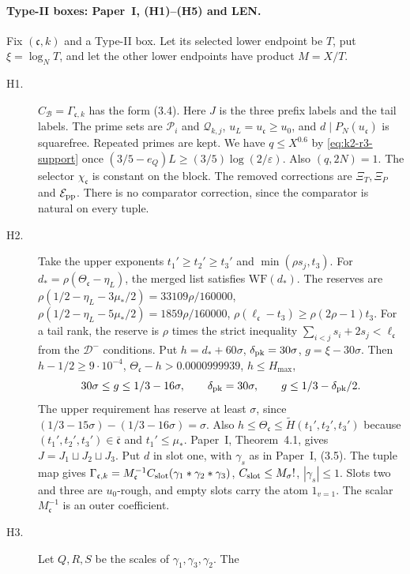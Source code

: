 \paragraph{Type-II boxes: Paper~I, (H1)--(H5) and LEN.}
Fix \((\mathfrak c,k)\) and a Type-II box. Let its selected lower endpoint
be \(T\), put \(\xi=\log_NT\), and let the other lower endpoints have product \(M=X/T\).
\begin{description}
\item[H1.] \(C_{\mathcal B}=\Gamma_{\mathfrak c,k}\) has the form (3.4). Here
\(J\) is the three prefix labels and the tail labels. The prime sets are
\(\mathcal P_i\) and \(\mathcal Q_{k,j}\), \(u_L=u_{\mathfrak c}\ge u_0\),
and \(d\mid P_N(u_{\mathfrak c})\) is squarefree. Repeated primes are kept.
We have \(q\le X^{0.6}\) by \eqref{eq:k2-r3-support} once
\((3/5-e_Q)L\ge(3/5)\log(2/\varepsilon)\). Also \((q,2N)=1\). The
selector \(\chi_{\mathfrak c}\) is constant on the block. The removed
corrections are \(\Xi_T,\Xi_P\) and \(\mathcal E_{\rm pp}\). There is no
comparator correction, since the comparator is natural on every tuple.
\item[H2.] Take the upper exponents \(t_1'\ge t_2'\ge t_3'\) and
\(\min(\rho s_j,t_3)\). For \(d_*=\rho(\Theta_{\mathfrak c}-\eta_L)\), the
merged list satisfies \(\mathrm{WF}(d_*)\). The reserves are
\(\rho(1/2-\eta_L-3\mu_*/2)=33109\rho/160000\),
\(\rho(1/2-\eta_L-5\mu_*/2)=1859\rho/160000\), \(\rho(\ell_{\mathfrak c}-t_3)
\ge\rho(2\rho-1)t_3\). For a tail rank, the reserve is \(\rho\) times the strict
inequality \(\sum_{i<j}s_i+2s_j<\ell_{\mathfrak c}\) from the
\(\mathcal D^-\) conditions. Put \(h=d_*+60\sigma\), \(\delta_{\rm pk}=30\sigma\),
\(g=\xi-30\sigma\). Then \(h-1/2\ge9\cdot10^{-4}\),
\(\Theta_{\mathfrak c}-h>0.0000999939\), \(h\le H_{\max}\),
\[
30\sigma\le g\le1/3-16\sigma,
\qquad \delta_{\rm pk}=30\sigma,
\qquad g\le1/3-\delta_{\rm pk}/2.
\]
The upper requirement has reserve at least \(\sigma\), since
\((1/3-15\sigma)-(1/3-16\sigma)=\sigma\). Also
\(h\le\Theta_{\mathfrak c}\le\widetilde H(t_1',t_2',t_3')\) because
\((t_1',t_2',t_3')\in\overline{\mathfrak c}\) and \(t_1'\le\mu_*\).
Paper~I, Theorem~4.1, gives \(J=J_1\sqcup J_2\sqcup J_3\). Put \(d\) in
slot one, with \(\gamma_s\) as in Paper~I, (3.5). The tuple map gives
\(\Gamma_{\mathfrak c,k}=M_{\mathfrak c}^{-1}C_{\rm slot}(\gamma_1*\gamma_2*\gamma_3)\),
\(C_{\rm slot}\le M_\sigma!\), \(|\gamma_s|\le1\). Slots two and three are
\(u_0\)-rough, and empty slots carry the atom \(1_{v=1}\). The scalar
\(M_{\mathfrak c}^{-1}\) is an outer coefficient.
\item[H3.] Let \(Q,R,S\) be the scales of \(\gamma_1,\gamma_3,\gamma_2\). The

\end{description}
